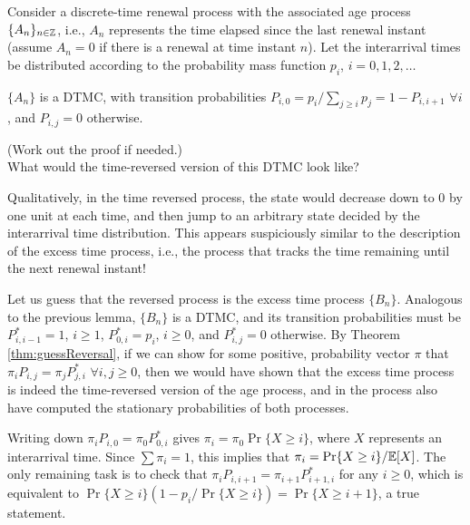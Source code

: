 \documentclass[a4paper,10pt,english]{article}
\begin{document}
\begin{shaded*}
\begin{exmp}
Consider a discrete-time renewal process with the associated age process $\{A_n\}_{n \in \mathbb{Z}}$, i.e., $A_n$ represents the time elapsed since the last renewal instant (assume $A_n = 0$ if there is a renewal at time instant $n$). Let the interarrival times be distributed according to the probability mass function $p_i$,  $i = 0, 1, 2, \ldots$
\end{exmp}
\end{shaded*}
\begin{lem}
$\{A_n\}$ is a DTMC, with transition probabilities $P_{i,0} = p_i/\sum_{j \geq i} p_j = 1 - P_{i,i+1}$ $\forall i $, and $P_{i,j} = 0$ otherwise.  
\end{lem}
\noindent (Work out the proof if needed.) \\

 What would the time-reversed version of this DTMC look like? 

Qualitatively, in the time reversed process, the state would decrease down to $0$ by one unit at each time, and then jump to an arbitrary state decided by the interarrival time distribution. This appears suspiciously similar to the description of the excess time process, i.e., the process that tracks the time remaining until the next renewal instant!

Let us guess that the reversed process is the excess time process $\{B_n\}$. Analogous to the previous lemma, $\{B_n\}$ is a DTMC, and its transition probabilities must be $P^\ast_{i,i-1} = 1$, $i \geq 1$, $P^\ast_{0,i} = p_i$, $i \geq 0$, and $P^\ast_{i,j} = 0$ otherwise. By Theorem \ref{thm:guessReversal}, if we can show for some positive, probability vector $\pi$ that $\pi_i P_{i,j} = \pi_j P^\ast_{j,i}$ $\forall i, j \geq 0$, then we would have shown that the excess time process is indeed the time-reversed version of the age process, and in the process also have computed the stationary probabilities of both processes. 

Writing down $\pi_i P_{i,0} = \pi_0 P^\ast_{0,i}$ gives $\pi_i = \pi_0 \Pr\{X \geq i\}$, where $X$ represents an interarrival time. Since $\sum \pi_i = 1$, this implies that $\pi_i = \Pr\{X \geq i\}/\mathbb{E}[X]$. The only remaining task is to check that $\pi_i P_{i,i+1} = \pi_{i+1} P^\ast_{i+1,i}$ for any $i \geq 0$, which is equivalent to $ \Pr\{X \geq i\} \left( 1 - p_i/ \Pr\{X \geq i\}\right) =  \Pr\{X \geq i+1\}$, a true statement.  
\end{document}
